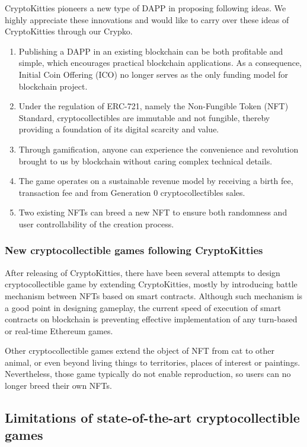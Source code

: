 \documentclass[a4paper]{article}
\begin{document}
CryptoKitties pioneers a new type of DAPP in proposing following ideas. 
We highly appreciate these innovations and would like to carry over these ideas of CryptoKitties through our Crypko.

\begin{enumerate}
\item Publishing a DAPP in an existing blockchain can be both profitable and simple, which encourages practical blockchain applications. As a consequence, Initial Coin Offering (ICO) no longer serves as the only funding model for blockchain project.
\item Under the regulation of ERC-721, namely the Non-Fungible Token (NFT) Standard, cryptocollectibles are immutable and not fungible, thereby providing a foundation of its digital scarcity and value.
\item Through gamification, anyone can experience the convenience and revolution brought to us by blockchain without caring complex technical details.
\item The game operates on a sustainable revenue model by receiving a birth fee, transaction fee and from Generation 0 cryptocollectibles sales.
\item Two existing NFTs can breed a new NFT to ensure both randomness and user controllability of the creation process.
\end{enumerate}


\subsubsection{New cryptocollectible games following CryptoKitties}
After releasing of CryptoKitties, there have been several attempts to design cryptocollectible game by extending CryptoKitties, 
mostly by introducing battle mechanism between NFTs\cite{cryptofighters,fishbank,cryptomons,etheremon} based on smart contracts. 
Although such mechanism is a good point in designing gameplay,
the current speed of execution of smart contracts on blockchain is preventing effective implementation of any turn-based or real-time Ethereum games.

Other cryptocollectible games extend the object of NFT from cat to other animal\cite{cryptopets,etheremon}, or even beyond living things to territories\cite{cryptocountries}, places of interest\cite{cryptolandmarks} or paintings\cite{cryptoarts}. 
Nevertheless, those game typically do not enable reproduction, 
so users can no longer breed their own NFTs.

\subsection{Limitations of state-of-the-art cryptocollectible games}
\end{document}
